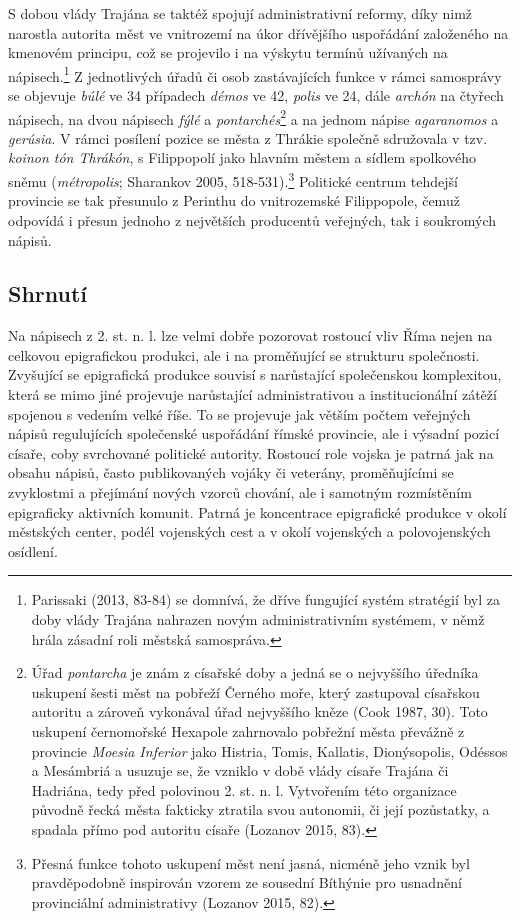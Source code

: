 S dobou vlády Trajána se taktéž spojují administrativní reformy, díky nimž narostla autorita měst ve vnitrozemí na úkor dřívějšího uspořádání založeného na kmenovém principu, což se projevilo i na výskytu termínů užívaných na nápisech.\footnote{Parissaki (2013, 83-84) se domnívá, že dříve fungující systém stratégií byl za doby vlády Trajána nahrazen novým administrativním systémem, v němž hrála zásadní roli městská samospráva.} Z jednotlivých úřadů či osob zastávajících funkce v rámci samosprávy se objevuje {\em búlé} ve 34 případech {\em démos} ve 42, {\em polis} ve 24, dále {\em archón} na čtyřech nápisech, na dvou nápisech {\em fýlé} a {\em pontarchés}\footnote{Úřad {\em pontarcha} je znám z císařské doby a jedná se o nejvyššího úředníka uskupení šesti měst na pobřeží Černého moře, který zastupoval císařskou autoritu a zároveň vykonával úřad nejvyššího kněze (Cook 1987, 30). Toto uskupení černomořské Hexapole zahrnovalo pobřežní města převážně z provincie {\em Moesia Inferior} jako Histria, Tomis, Kallatis, Dionýsopolis, Odéssos a Mesámbriá a usuzuje se, že vzniklo v době vlády císaře Trajána či Hadriána, tedy před polovinou 2. st. n. l. Vytvořením této organizace původně řecká města fakticky ztratila svou autonomii, či její pozůstatky, a spadala přímo pod autoritu císaře (Lozanov 2015, 83).} a na jednom nápise {\em agaranomos} a {\em gerúsia}. V rámci posílení pozice se města z Thrákie společně sdružovala v tzv. {\em koinon tón Thrákón}, s Filippopolí jako hlavním městem a sídlem spolkového sněmu ({\em métropolis}; Sharankov 2005, 518-531).\footnote{Přesná funkce tohoto uskupení měst není jasná, nicméně jeho vznik byl pravděpodobně inspirován vzorem ze sousední Bíthýnie pro usnadnění provinciální administrativy (Lozanov 2015, 82).} Politické centrum tehdejší provincie se tak přesunulo z Perinthu do vnitrozemské Filippopole, čemuž odpovídá i přesun jednoho z největších producentů veřejných, tak i soukromých nápisů.

\subsection[shrnutí-17]{Shrnutí}

Na nápisech z 2. st. n. l. lze velmi dobře pozorovat rostoucí vliv Říma nejen na celkovou epigrafickou produkci, ale i na proměňující se strukturu společnosti. Zvyšující se epigrafická produkce souvisí s narůstající společenskou komplexitou, která se mimo jiné projevuje narůstající administrativou a institucionální zátěží spojenou s vedením velké říše. To se projevuje jak větším počtem veřejných nápisů regulujících společenské uspořádání římské provincie, ale i výsadní pozicí císaře, coby svrchované politické autority. Rostoucí role vojska je patrná jak na obsahu nápisů, často publikovaných vojáky či veterány, proměňujícími se zvyklostmi a přejímání nových vzorců chování, ale i samotným rozmístěním epigraficky aktivních komunit. Patrná je koncentrace epigrafické produkce v okolí městských center, podél vojenských cest a v okolí vojenských a polovojenských osídlení.

